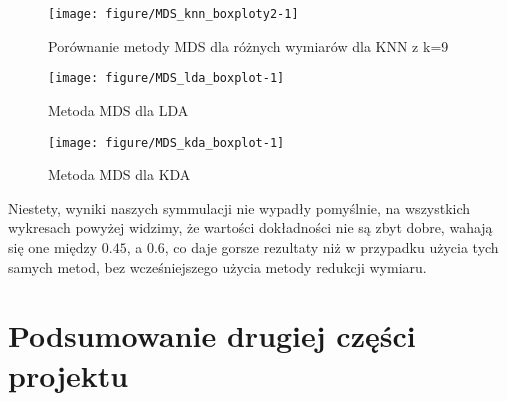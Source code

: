 \documentclass[12pt, a4paper]{article}\usepackage[]{graphicx}\usepackage[]{xcolor}
\makeatletter
\def\maxwidth{ %
  \ifdim\Gin@nat@width>\linewidth
    \linewidth
  \else
    \Gin@nat@width
  \fi
}
\newenvironment{knitrout}{}{} %
\makeatother
\begin{document}
\begin{knitrout}
\color{fgcolor}\begin{figure}[H]

{\centering \texttt{[image: figure/MDS\_knn\_boxploty2-1]} 

}

\caption[Porównanie metody MDS dla różnych wymiarów dla KNN z k=9]{Porównanie metody MDS dla różnych wymiarów dla KNN z k=9}\label{fig:MDS_knn_boxploty2}
\end{figure}

\end{knitrout}



\begin{knitrout}
\color{fgcolor}\begin{figure}[H]

{\centering \texttt{[image: figure/MDS\_lda\_boxplot-1]} 

}

\caption[Metoda MDS dla LDA]{Metoda MDS dla LDA}\label{fig:MDS_lda_boxplot}
\end{figure}

\end{knitrout}



\begin{knitrout}
\color{fgcolor}\begin{figure}[H]

{\centering \texttt{[image: figure/MDS\_kda\_boxplot-1]} 

}

\caption[Metoda MDS dla KDA]{Metoda MDS dla KDA}\label{fig:MDS_kda_boxplot}
\end{figure}

\end{knitrout}
Niestety, wyniki naszych symmulacji nie wypadły pomyślnie, na wszystkich wykresach powyżej widzimy, że wartości dokładności nie są zbyt dobre, wahają się one między $0.45$, a $0.6$, co daje gorsze rezultaty niż w przypadku użycia tych samych metod, bez wcześniejszego użycia metody redukcji wymiaru.


\section{Podsumowanie drugiej części projektu}
\end{document}
